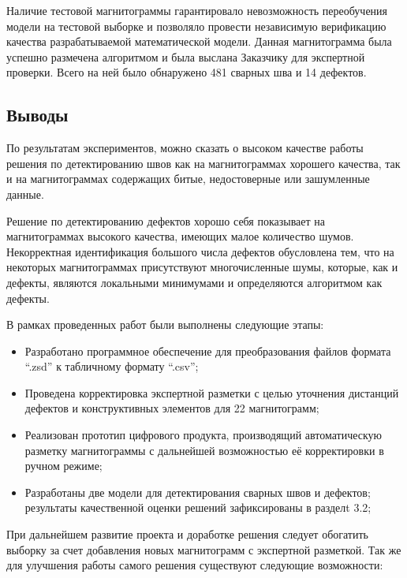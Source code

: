 \documentclass[a4paper,article,14pt]{extarticle}
\begin{document}
Наличие тестовой магнитограммы гарантировало невозможность переобучения модели на тестовой выборке 
и позволяло провести независимую верификацию качества разрабатываемой математической модели. 
Данная магнитограмма была успешно размечена алгоритмом и была выслана Заказчику для экспертной 
проверки. Всего на ней было обнаружено 481 сварных шва и 14 дефектов.

\subsection{Выводы}

По результатам экспериментов, можно сказать о высоком качестве работы решения по детектированию швов 
как на магнитограммах хорошего качества, так и на магнитограммах содержащих битые, недостоверные или 
зашумленные данные.

Решение по детектированию дефектов хорошо себя показывает на магнитограммах высокого качества, 
имеющих малое количество шумов.  Некорректная идентификация большого числа дефектов обусловлена 
тем, что на некоторых магнитограммах присутствуют многочисленные шумы, которые, как и дефекты, 
являются локальными минимумами и определяются алгоритмом как дефекты.


\pagebreak
{}

В рамках проведенных работ были выполнены следующие этапы:

\begin{itemize}
    \item Разработано программное обеспечение для преобразования файлов формата “.zsd” к табличному формату “.csv”;
    \item Проведена корректировка экспертной разметки с целью уточнения дистанций дефектов и конструктивных элементов для 22 магнитограмм; 
    \item Реализован прототип цифрового продукта, производящий автоматическую разметку магнитограммы с дальнейшей возможностью её корректировки в ручном режиме;
    \item Разработаны две модели для детектирования сварных швов и дефектов; результаты качественной оценки решений зафиксированы в разделt 3.2; 
\end{itemize}

При дальнейшем развитие проекта и доработке решения следует обогатить выборку за счет добавления новых магнитограмм 
с экспертной разметкой. Так же для улучшения работы самого решения существуют следующие возможности:
\end{document}
